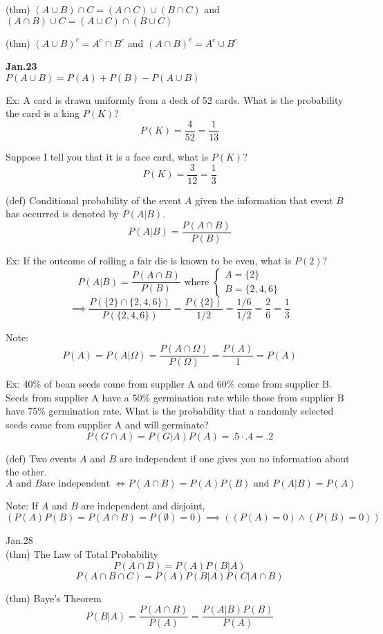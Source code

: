 \documentclass[12pt]{article}
\begin{document}
(thm) \((A\cup B)\cap C = (A\cap C)\cup(B\cap C)\) and \((A\cap B)\cup C = (A\cup C)\cap(B\cup C)\)

(thm) \((A \cup B)^c = A^c \cap B^c\) and \((A \cap B)^c = A^c \cup B^c\)

\textbf{Jan.23}\\
\(P(A\cup B)=P(A)+P(B)-P(A\cup B)\)

Ex: A card is drawn uniformly from a deck of 52 cards. What is the probability the card is a king \(P(K)\)? \[P(K) = \frac4{52} = \frac1{13}\]

Suppose I tell you that it is a face card, what is \(P(K)\)?
\[P(K) = \frac{3}{12} = \frac13\]

(def) Conditional probability of the event \(A\) given the information that event \(B\) has occurred is denoted by \(P(A|B)\).\[P(A|B)=\frac{P(A\cap B)}{P(B)}\]

Ex: If the outcome of rolling a fair die is known to be even, what is \(P(2)\)?
\[
P(A|B)=\frac{P(A\cap B)}{P(B)} \text{ where } \begin{cases} 
      A = \{2\}\\
      B = \{2,4,6\}
   \end{cases}
\]
\[
\implies \frac{P(\{2\}\cap \{2,4,6\})}{P(\{2,4,6\})} = \frac{P(\{2\})}{1/2} = \frac{1/6}{1/2} = \frac26 = \frac{1}3
\]

Note:
\[
P(A) = P(A|\Omega) = \frac{P(A\cap\Omega)}{P(\Omega)} = \frac{P(A)}1 = P(A)
\]

Ex: 40\% of bean seeds come from supplier A and 60\% come from supplier B. Seeds from supplier A have a 50\% germination rate while those from supplier B have 75\% germination rate. What is the probability that a randomly selected seeds came from supplier A and will germinate?
\[
P(G\cap A)=P(G|A)P(A) = .5\cdot.4 = .2
\]

(def) Two events \(A\) and \(B\)  are independent if one gives you no information about the other. 
\[ A \text{ and } B \text{are independent } \iff P(A\cap B) = P(A)P(B) \text{ and } P(A|B) = P(A)
\]

Note: If \(A\) and \(B\) are independent and disjoint,
\[(P(A)P(B) = P(A\cap B) = P(\emptyset) = 0) \implies ((P(A)=0)\wedge(P(B) = 0))\]

Jan.28\\

(thm) The Law of Total Probability
\[P(A\cap B) = P(A)P(B|A)\]\[P(A\cap B\cap C) = P(A)P(B|A)P(C|A\cap B)\]

(thm) Baye's Theorem
\[P(B|A)=\frac{P(A\cap B)}{P(A)}=\frac{P(A|B)P(B)}{P(A)}\]
\end{document}

